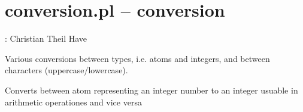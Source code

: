 


\section{conversion.pl -- conversion}

\label{sec:conversion}

\begin{tags}
: Christian Theil Have
\end{tags}

Various conversions between types, i.e. atoms and integers, and between characters (uppercase/lowercase).\vspace{0.7cm}

\begin{description}
Converts between atom representing an integer number to an
integer usuable in arithmetic operationes and vice versa
\end{description}

